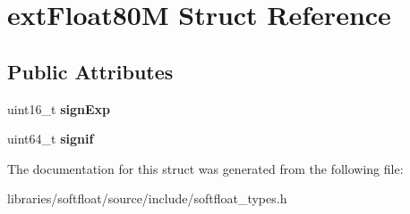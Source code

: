 \hypertarget{structext_float80_m}{}\section{ext\+Float80M Struct Reference}
\label{structext_float80_m}
\subsection*{Public Attributes}
\begin{DoxyCompactItemize}
\item 
\mbox{\label{structext_float80_m_afcc87c4645279344c5365a291766afe2}} 
uint16\+\_\+t {\bfseries sign\+Exp}
\item 
\mbox{\label{structext_float80_m_ac0c736880d01d0abd0a818e658755b3b}} 
uint64\+\_\+t {\bfseries signif}
\end{DoxyCompactItemize}


The documentation for this struct was generated from the following file\+:\begin{DoxyCompactItemize}
\item 
libraries/softfloat/source/include/softfloat\+\_\+types.\+h\end{DoxyCompactItemize}
